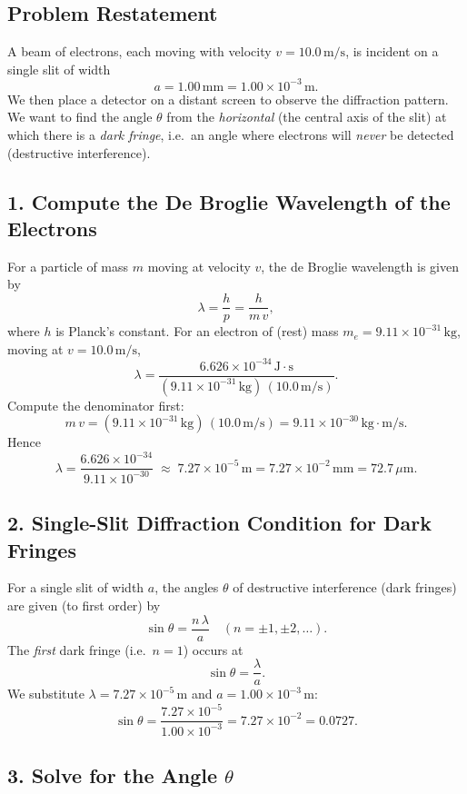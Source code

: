 \documentclass[12pt]{article}
\theoremstyle{definition} %
\theoremstyle{plain} %
\begin{document}
\subsection*{Problem Restatement}

A beam of electrons, each moving with velocity $v = 10.0\,\text{m/s}$, is incident on a single slit of width 
\[
a = 1.00\,\text{mm} = 1.00 \times 10^{-3}\,\text{m}.
\]
We then place a detector on a distant screen to observe the diffraction pattern. 
We want to find the angle $\theta$ from the \emph{horizontal} (the central axis of the slit) at which there is a 
\emph{dark fringe}, i.e.\ an angle where electrons will \emph{never} be detected (destructive interference).

\subsection*{1. Compute the De Broglie Wavelength of the Electrons}

For a particle of mass $m$ moving at velocity $v$, the de Broglie wavelength is given by
\[
\lambda = \frac{h}{p} = \frac{h}{m\,v},
\]
where $h$ is Planck's constant. For an electron of (rest) mass $m_e = 9.11 \times 10^{-31}\,\text{kg}$, moving at 
$v = 10.0\,\text{m/s}$,
\[
\lambda 
= \frac{6.626 \times 10^{-34}\,\text{J}\cdot\text{s}}{(9.11 \times 10^{-31}\,\text{kg})\,(10.0\,\text{m/s})}.
\]
Compute the denominator first:
\[
m\,v 
= (9.11 \times 10^{-31}\,\text{kg})\,(10.0\,\text{m/s})
= 9.11 \times 10^{-30}\,\text{kg}\cdot\text{m/s}.
\]
Hence
\[
\lambda 
= \frac{6.626 \times 10^{-34}}{9.11 \times 10^{-30}}
\;\approx\;
7.27 \times 10^{-5}\,\text{m}
= 7.27 \times 10^{-2}\,\text{mm}
= 72.7\,\mu\text{m}.
\]

\subsection*{2. Single-Slit Diffraction Condition for Dark Fringes}

For a single slit of width $a$, the angles $\theta$ of destructive interference (dark fringes) are given (to first order) by
\[
\sin\theta = \frac{n\,\lambda}{a}
\quad
(n = \pm 1, \pm 2, \ldots).
\]
The \emph{first} dark fringe (i.e.\ $n=1$) occurs at
\[
\sin\theta = \frac{\lambda}{a}.
\]
We substitute $\lambda = 7.27 \times 10^{-5}\,\text{m}$ and $a = 1.00 \times 10^{-3}\,\text{m}$:
\[
\sin\theta 
= \frac{7.27 \times 10^{-5}}{1.00 \times 10^{-3}}
= 7.27 \times 10^{-2}
= 0.0727.
\]

\subsection*{3. Solve for the Angle $\theta$}
\end{document}
